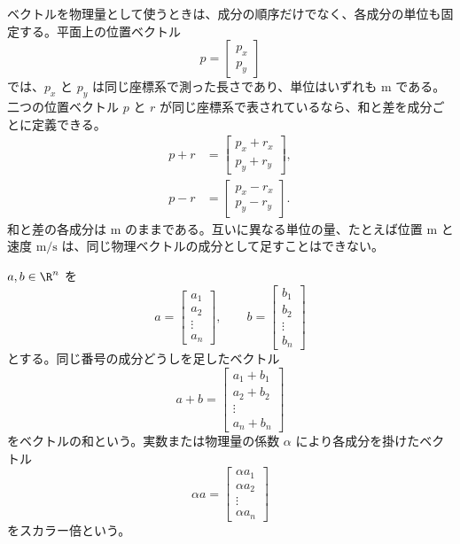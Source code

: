 ベクトルを物理量として使うときは、成分の順序だけでなく、各成分の単位も固定する。平面上の位置ベクトル
\begin{equation}
  p=\begin{bmatrix}p_x\\p_y\end{bmatrix}
\end{equation}
では、$p_x$ と $p_y$ は同じ座標系で測った長さであり、単位はいずれも m である。二つの位置ベクトル $p$ と $r$ が同じ座標系で表されているなら、和と差を成分ごとに定義できる。
\begin{align}
  p+r
  &=
  \begin{bmatrix}p_x+r_x\\p_y+r_y\end{bmatrix},\\
  p-r
  &=
  \begin{bmatrix}p_x-r_x\\p_y-r_y\end{bmatrix}.
\end{align}
和と差の各成分は m のままである。互いに異なる単位の量、たとえば位置 m と速度 $\mathrm{m/s}$ は、同じ物理ベクトルの成分として足すことはできない。

\begin{definition}[ベクトルの和とスカラー倍]
$a,b\in\R^n$ を
\begin{equation}
  a=\begin{bmatrix}a_1\\a_2\\\vdots\\a_n\end{bmatrix},
  \qquad
  b=\begin{bmatrix}b_1\\b_2\\\vdots\\b_n\end{bmatrix}
\end{equation}
とする。同じ番号の成分どうしを足したベクトル
\begin{equation}
  a+b=
  \begin{bmatrix}
    a_1+b_1\\
    a_2+b_2\\
    \vdots\\
    a_n+b_n
  \end{bmatrix}
\end{equation}
をベクトルの和という。実数または物理量の係数 $\alpha$ により各成分を掛けたベクトル
\begin{equation}
  \alpha a=
  \begin{bmatrix}
    \alpha a_1\\
    \alpha a_2\\
    \vdots\\
    \alpha a_n
  \end{bmatrix}
\end{equation}
をスカラー倍という。
\end{definition}

